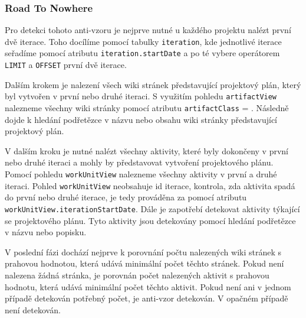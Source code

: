 \documentclass[czech,DP]{thesiskiv}
\begin{document}
\subsubsection{Road To Nowhere}
Pro detekci tohoto anti-vzoru je nejprve nutné u každého projektu nalézt první dvě iterace. Toho docílíme pomocí tabulky \texttt{iteration}, kde jednotlivé iterace seřadíme pomocí atributu \texttt{iteration.startDate} a po té vybere operátorem \texttt{LIMIT} a \texttt{OFFSET} první dvě iterace.
\par
Dalším krokem je nalezení všech wiki stránek představující projektový plán, který byl vytvořen v první nebo druhé iteraci. S využitím pohledu \texttt{artifactView} nalezneme všechny wiki stránky pomocí atributu \texttt{artifactClass} = . Následně dojde k hledání podřetězce v názvu nebo obsahu wiki stránky představující projektový plán.
\par
V dalším kroku je nutné nalézt všechny aktivity, které byly dokončeny v první nebo druhé iteraci a mohly by představovat vytvoření projektového plánu. Pomocí pohledu \texttt{workUnitView} nalezneme všechny aktivity v první a druhé iteraci. Pohled \texttt{workUnitView} neobsahuje id iterace, kontrola, zda aktivita spadá do první nebo druhé iterace, je tedy prováděna za pomocí atributu \texttt{workUnitView.iterationStartDate}. Dále je zapotřebí detekovat aktivity týkající se projektového plánu. Tyto aktivity jsou detekovány pomocí hledání podřetězce v názvu nebo popisku.
\par
V poslední fázi dochází nejprve k porovnání počtu nalezených wiki stránek s prahovou hodnotou, která udává minimální počet těchto stránek. Pokud není nalezena žádná stránka, je porovnán počet nalezených aktivit s prahovou hodnotu, která udává minimální počet těchto aktivit. Pokud není ani v jednom případě detekován potřebný počet, je anti-vzor detekován. V opačném případě není detekován.
\end{document}
